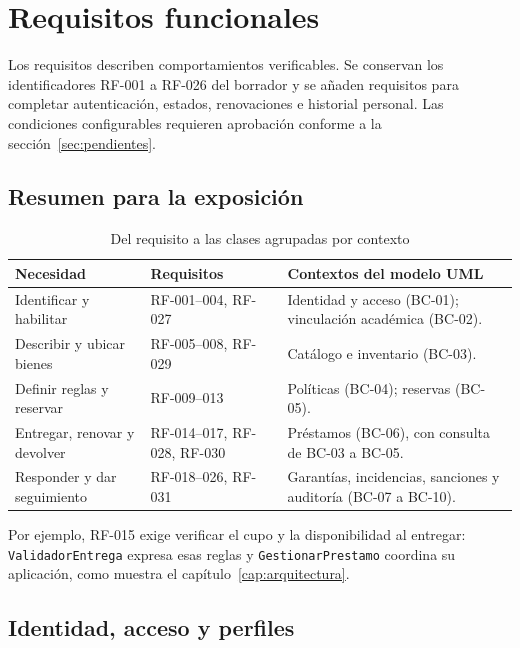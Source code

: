 \chapter{Requisitos funcionales}
\label{cap:rf}

Los requisitos describen comportamientos verificables. Se conservan los identificadores RF-001 a RF-026 del borrador y se a\~naden requisitos para completar autenticaci\'on, estados, renovaciones e historial personal. Las condiciones configurables requieren aprobaci\'on conforme a la secci\'on~\ref{sec:pendientes}.

\section{Resumen para la exposici\'on}

\begin{table}[htbp]
\centering\small
\begin{tabularx}{\textwidth}{@{}p{3cm}p{3cm}Y@{}}
\toprule
\textbf{Necesidad} & \textbf{Requisitos} & \textbf{Contextos del modelo UML} \\
\midrule
Identificar y habilitar & RF-001--004, RF-027 & Identidad y acceso (BC-01); vinculaci\'on acad\'emica (BC-02). \\
Describir y ubicar bienes & RF-005--008, RF-029 & Cat\'alogo e inventario (BC-03). \\
Definir reglas y reservar & RF-009--013 & Pol\'iticas (BC-04); reservas (BC-05). \\
Entregar, renovar y devolver & RF-014--017, RF-028, RF-030 & Pr\'estamos (BC-06), con consulta de BC-03 a BC-05. \\
Responder y dar seguimiento & RF-018--026, RF-031 & Garant\'ias, incidencias, sanciones y auditor\'ia (BC-07 a BC-10). \\
\bottomrule
\end{tabularx}
\caption{Del requisito a las clases agrupadas por contexto}
\end{table}

Por ejemplo, RF-015 exige verificar el cupo y la disponibilidad al entregar: \texttt{ValidadorEntrega} expresa esas reglas y \texttt{GestionarPrestamo} coordina su aplicaci\'on, como muestra el cap\'itulo~\ref{cap:arquitectura}.

\section{Identidad, acceso y perfiles}

